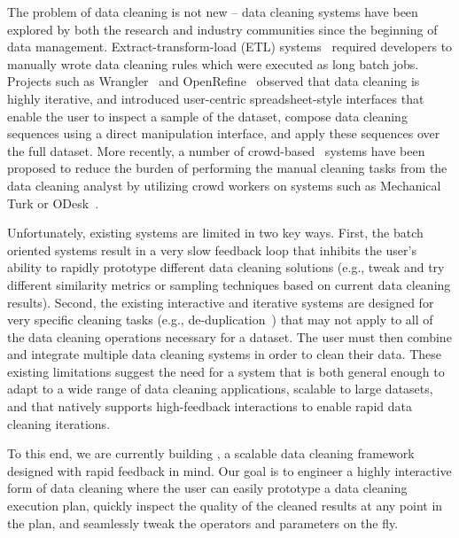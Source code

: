 The problem of data cleaning is not new -- data cleaning systems have been
explored by both the research and industry communities since the beginning of data management.
Extract-transform-load (ETL) systems~\cite{informatica,talend,nadeef,apachefalcon}
required developers to manually wrote data cleaning rules which were executed as 
long batch jobs.
Projects such as Wrangler~\cite{wrangler,trifacta} and
OpenRefine~\cite{openrefine} observed that data cleaning is highly iterative, and
introduced user-centric spreadsheet-style interfaces that enable the user to inspect a sample of the dataset, 
compose data cleaning sequences using a direct manipulation interface, and apply these sequences over the full dataset.   
More recently, a number of crowd-based~\cite{gokhale2014corleone,stonebraker2013data}
systems have been proposed to reduce the burden of performing the manual cleaning tasks from the data cleaning analyst 
by utilizing crowd workers on systems such as Mechanical Turk or ODesk~\cite{argonaut}.

Unfortunately, existing systems are limited in two key ways.
First, the batch oriented systems result in a very slow feedback loop 
that inhibits the user's ability to rapidly prototype different data cleaning solutions (e.g., tweak and 
try different similarity metrics or sampling techniques based on current data cleaning results).
Second, the existing interactive and iterative systems are designed for very specific cleaning tasks 
(e.g., de-duplication~\cite{gokhale2014corleone,park2014crowdfill,eracer,chen2014integrating}) that may not apply to all of the data 
cleaning operations necessary for a dataset.  The user must then combine and integrate multiple
data cleaning systems in order to clean their data.
These existing limitations suggest the need for a system that is both general enough to
adapt to a wide range of data cleaning applications, scalable to large datasets, 
and that natively supports high-feedback interactions to enable rapid data cleaning iterations.

To this end, we are currently building \sys, a scalable data cleaning
framework designed with rapid feedback in mind.  Our goal is to
engineer a highly interactive form of data cleaning where the user can easily prototype a data cleaning execution plan,
quickly inspect the quality of the cleaned results at any point in the plan, and seamlessly
tweak the operators and parameters on the fly.

